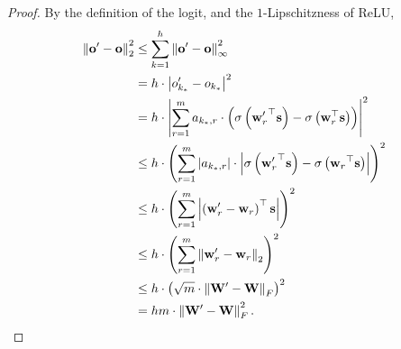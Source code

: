 \documentclass[10pt]{article}
\def\rvo{{\mathbf{o}}}
\def\rvs{{\mathbf{s}}}
\def\rvw{{\mathbf{w}}}
\def\rvo{{\mathbf{o}}}
\def\rmW{{\mathbf{W}}}
\begin{document}
\begin{proof}
By the definition of the logit, and the $1$-Lipschitzness of ReLU,
\begin{equation*}
\begin{split}
    \left\| \rvo^\prime - \rvo \right\|_2^2 &\le \sum\limits_{k = 1}^{h}{ \left\| \rvo^\prime - \rvo \right\|_\infty^2} \\
    &= h \cdot \left| o_{k_*}^\prime - o_{k_*} \right|^2 \\
    &= h \cdot \left| \sum\limits_{r=1}^{m}{ a_{k_*,r} \cdot \left( \sigma\left({\rvw_r^\prime}^\top \rvs \right) - \sigma\left(\rvw_r^\top \rvs \right) \right)} \right|^2 \\
    &\le h \cdot \left( \sum\limits_{r=1}^{m}{ \left| a_{k_*,r} \right| \cdot \left| \sigma\left({\rvw_r^\prime}^\top \rvs\right) - \sigma\left({\rvw_r}^\top \rvs\right) \right|  } \right)^2 \\
    &\le h \cdot \left( \sum\limits_{r=1}^{m}{ \left| \left({\rvw_r^\prime} - \rvw_r \right)^\top \rvs\right|  } \right)^2 \\
    &\le h \cdot \left( \sum\limits_{r=1}^{m}{ \left\| {\rvw_r^\prime} - \rvw_r \right\|_2  } \right)^2 \\
    &\le h \cdot \left( \sqrt{m} \cdot \left\| \rmW^\prime - \rmW \right\|_F \right)^2 \\
    &= h m \cdot \left\| \rmW^\prime - \rmW \right\|_F^2. \qedhere
\end{split}
\end{equation*}
\end{proof}
\end{document}
